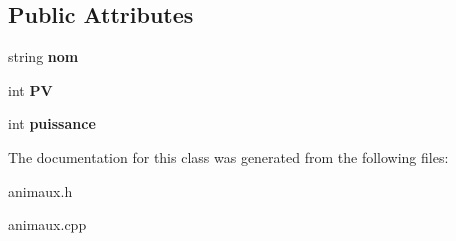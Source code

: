 \subsection*{Public Attributes}
\begin{DoxyCompactItemize}
\item 
\mbox{\label{classAnimaux_aaa578d600c1a221c198256ffc409c047}} 
string {\bfseries nom}
\item 
\mbox{\label{classAnimaux_ab44bc431f44a297eddc8e66bfc2a0f1d}} 
int {\bfseries PV}
\item 
\mbox{\label{classAnimaux_a3a12242e4112a67c50fd43d9c36e5d28}} 
int {\bfseries puissance}
\end{DoxyCompactItemize}


The documentation for this class was generated from the following files\+:\begin{DoxyCompactItemize}
\item 
animaux.\+h\item 
animaux.\+cpp\end{DoxyCompactItemize}
